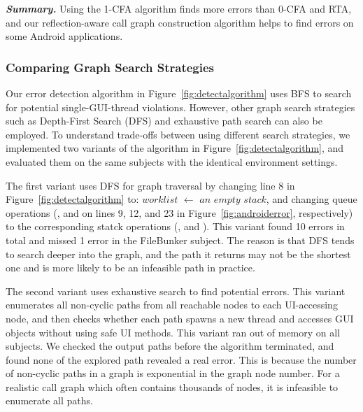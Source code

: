 
\vspace{1mm}

\noindent \textbf{\textit{Summary.}} Using the 1-CFA 
algorithm finds more errors than 0-CFA and RTA, and our reflection-aware call
graph construction algorithm helps to find errors on some
Android applications.

\subsubsection{Comparing Graph Search Strategies}
\label{sec:search}

Our error detection algorithm in Figure~\ref{fig:detectalgorithm} uses BFS to search for
potential single-GUI-thread violations. However, other graph search strategies such as
Depth-First Search (DFS) and exhaustive path search can also be employed. To
understand trade-offs between using different search strategies, we 
implemented two variants of the algorithm in Figure~\ref{fig:detectalgorithm}, and
evaluated them on the same subjects with the identical environment settings.

The first variant uses DFS for graph traversal by changing
line 8 in Figure~\ref{fig:detectalgorithm} to:
$\mathit{worklist}$ $\leftarrow$ $\mathit{an}$ $\mathit{empty}$ $\mathit{stack}$,
and changing queue operations (, and 
on lines 9, 12, and
23 in Figure~\ref{fig:androiderror}, respectively)
to the corresponding statck operations (, and ).
This variant found 10 errors in total and missed 1 error in the FileBunker subject.
The reason is that DFS tends to search deeper into the graph, and the path it returns
may not be the shortest one and is more likely to be an infeasible path in practice.


The second variant uses exhaustive search to find potential errors. This variant
enumerates all non-cyclic paths from all reachable  nodes
to each UI-accessing node, and then checks whether each
path spawns a new thread and accesses GUI objects without using safe UI methods.
This variant ran out of memory on all subjects. We checked
the output paths before the algorithm terminated, and found none of the explored
path revealed a real error. This is because the number of
non-cyclic paths in a graph is exponential in the graph node number.
For a realistic call graph which often contains thousands of nodes,
it is infeasible to enumerate all paths.


